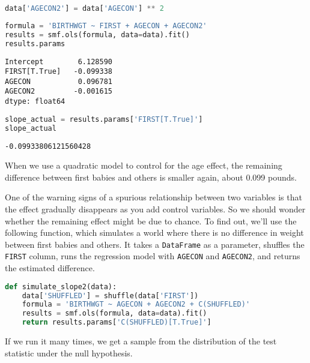 \begin{lstlisting}[language=Python,style=source]
data['AGECON2'] = data['AGECON'] ** 2
\end{lstlisting}

\begin{lstlisting}[language=Python,style=source]
formula = 'BIRTHWGT ~ FIRST + AGECON + AGECON2'
results = smf.ols(formula, data=data).fit()
results.params
\end{lstlisting}

\begin{lstlisting}[style=output]
Intercept        6.128590
FIRST[T.True]   -0.099338
AGECON           0.096781
AGECON2         -0.001615
dtype: float64
\end{lstlisting}

\begin{lstlisting}[language=Python,style=source]
slope_actual = results.params['FIRST[T.True]']
slope_actual
\end{lstlisting}

\begin{lstlisting}[style=output]
-0.09933806121560428
\end{lstlisting}

When we use a quadratic model to control for the age effect, the
remaining difference between first babies and others is smaller again,
about 0.099 pounds.

One of the warning signs of a spurious relationship between two
variables is that the effect gradually disappears as you add control
variables. So we should wonder whether the remaining effect might be due
to chance. To find out, we'll use the following function, which
simulates a world where there is no difference in weight between first
babies and others. It takes a \passthrough{\lstinline!DataFrame!} as a
parameter, shuffles the \passthrough{\lstinline!FIRST!} column, runs the
regression model with \passthrough{\lstinline!AGECON!} and
\passthrough{\lstinline!AGECON2!}, and returns the estimated difference.

\begin{lstlisting}[language=Python,style=source]
def simulate_slope2(data):
    data['SHUFFLED'] = shuffle(data['FIRST'])
    formula = 'BIRTHWGT ~ AGECON + AGECON2 + C(SHUFFLED)'
    results = smf.ols(formula, data=data).fit()
    return results.params['C(SHUFFLED)[T.True]']
\end{lstlisting}

If we run it many times, we get a sample from the distribution of the
test statistic under the null hypothesis.


